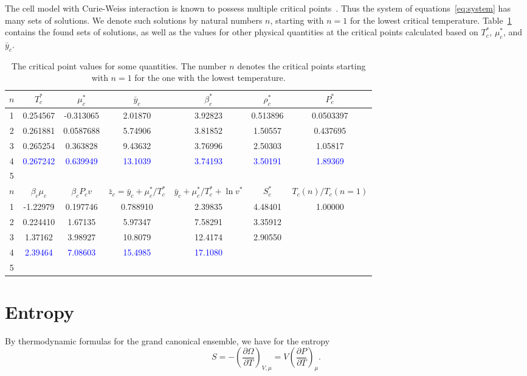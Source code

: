 \documentclass[12pt]{article}
\numberwithin{equation}{section}
\begin{document}
	The cell model with Curie-Weiss interaction is known to possess multiple critical points~\cite{KKD18,KKD20,KD22}. Thus the system of equations~\eqref{eq:system} has many sets of solutions. We denote such solutions by natural numbers $n$, starting with $n=1$ for the lowest critical temperature. Table~\ref{tab:cp} contains the found sets of solutions, as well as the values for other physical quantities at the critical points calculated based on $T^*_c$, $\mu^*_c$, and $\bar{y}_c$.
	
	\begin{table}[h]
		\centering
		\caption{The critical point values for some quantities. The number $n$ denotes the critical points starting with $n=1$ for the one with the lowest temperature.}
		\begin{tabular}{|c|c|c|c|c|c|c|}
			\hline
			$n$ & $T^*_c$ & $\mu^*_c$ & $\bar{y}_c$ & $\beta^*_c$ & $\rho^*_c$ & $P^*_c$ \\
			\hline
			1 & 0.254567 & -0.313065 & 2.01870 & 3.92823 & 0.513896 & 0.0503397  \\
			2 & 0.261881 & 0.0587688 & 5.74906 & 3.81852 & 1.50557 & 0.437695  \\
			3 & 0.265254 & 0.363828 & 9.43632 & 3.76996 & 2.50303 & 1.05817 \\
			4 & \textcolor{blue}{0.267242} & \textcolor{blue}{0.639949} & \textcolor{blue}{13.1039} & \textcolor{blue}{3.74193} & \textcolor{blue}{3.50191} & \textcolor{blue}{1.89369} \\
			5 & & & & & & \\
			\hline
			$n$ & $\beta_c\mu_c$ & $\beta_c P_c v$ & $\bar{z}_c=\bar{y}_c+\mu^*_c/T^*_c$ & $\bar{y}_c+\mu^*_c/T^*_c + \ln v^*$ & $S^*_c$ & $T_c(n)/T_c(n=1)$ \\
			\hline
			1 & -1.22979 & 0.197746 & 0.788910 & 2.39835 & 4.48401 & 1.00000 \\
			2 & 0.224410 & 1.67135 & 5.97347 & 7.58291 & 3.35912 & \\
			3 & 1.37162 & 3.98927 & 10.8079 & 12.4174 & 2.90550 & \\
			4 & \textcolor{blue}{2.39464}  & \textcolor{blue}{7.08603}& \textcolor{blue}{15.4985} & \textcolor{blue}{17.1080} & & \\
			5 &  & & & & & \\
			\hline
		\end{tabular}
		\label{tab:cp}
	\end{table}
	
	\pagebreak
	\section{Entropy}
	By thermodynamic formulas for the grand canonical ensemble, we have for the entropy
	\begin{equation}
		S = -\left(\frac{\partial \Omega}{\partial T}\right)_{V,\mu} = V\left(\frac{\partial P}{\partial T}\right)_{\mu}.
	\end{equation} 
	
\end{document}
